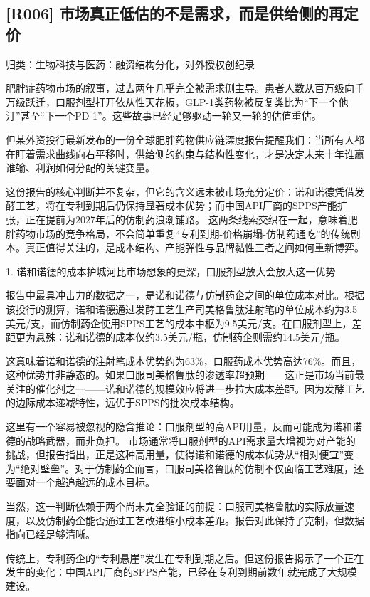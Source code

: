 \documentclass[11pt]{ctexart}
\begin{document}
\subsection{[R006] 市场真正低估的不是需求，而是供给侧的再定价}
{\small\color{refgray}归类：生物科技与医药：融资结构分化，对外授权创纪录}

肥胖症药物市场的叙事，过去两年几乎完全被需求侧主导。患者人数从百万级向千万级跃迁，口服剂型打开依从性天花板，GLP-1类药物被反复类比为“下一个他汀”甚至“下一个PD-1”。这些故事已经足够驱动一轮又一轮的估值重估。

但某外资投行最新发布的一份全球肥胖药物供应链深度报告提醒我们：当所有人都在盯着需求曲线向右平移时，供给侧的约束与结构性变化，才是决定未来十年谁赢谁输、利润如何分配的关键变量。

这份报告的核心判断并不复杂，但它的含义远未被市场充分定价：诺和诺德凭借发酵工艺，将在专利到期后仍保持显著成本优势；而中国API厂商的SPPS产能扩张，正在提前为2027年后的仿制药浪潮铺路。 这两条线索交织在一起，意味着肥胖药物市场的竞争格局，不会简单重复“专利到期-价格崩塌-仿制药通吃”的传统剧本。真正值得关注的，是成本结构、产能弹性与品牌黏性三者之间如何重新博弈。

1. 诺和诺德的成本护城河比市场想象的更深，口服剂型放大会放大这一优势

报告中最具冲击力的数据之一，是诺和诺德与仿制药企之间的单位成本对比。根据该投行的测算，诺和诺德通过发酵工艺生产司美格鲁肽注射笔的单位成本约为3.5美元/支，而仿制药企使用SPPS工艺的成本中枢为9.5美元/支。在口服剂型上，差距更为悬殊：诺和诺德的成本仅约3.5美元/瓶，仿制药企则需约14.5美元/瓶。

这意味着诺和诺德的注射笔成本优势约为63\%，口服药成本优势高达76\%。而且，这种优势并非静态的。如果口服司美格鲁肽的渗透率超预期——这正是市场当前最关注的催化剂之一——诺和诺德的规模效应将进一步拉大成本差距。因为发酵工艺的边际成本递减特性，远优于SPPS的批次成本结构。

这里有一个容易被忽视的隐含推论：口服剂型的高API用量，反而可能成为诺和诺德的战略武器，而非负担。 市场通常将口服剂型的API需求量大增视为对产能的挑战，但报告指出，正是这种高用量，使得诺和诺德的成本优势从“相对便宜”变为“绝对壁垒”。对于仿制药企而言，口服司美格鲁肽的仿制不仅面临工艺难度，还要面对一个越追越远的成本目标。

当然，这一判断依赖于两个尚未完全验证的前提：口服司美格鲁肽的实际放量速度，以及仿制药企能否通过工艺改进缩小成本差距。报告对此保持了克制，但数据指向已经足够清晰。

传统上，专利药企的“专利悬崖”发生在专利到期之后。但这份报告揭示了一个正在发生的变化：中国API厂商的SPPS产能，已经在专利到期前数年就完成了大规模建设。
\end{document}
